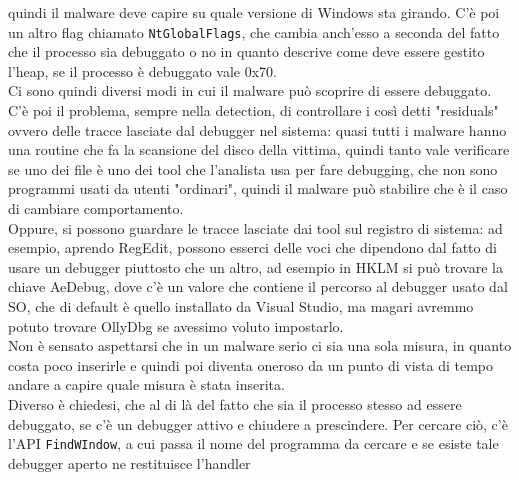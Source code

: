 \documentclass[12pt, oneside]{extbook}
\begin{document}
quindi il malware deve capire su quale versione di Windows sta girando. C'è poi un altro flag chiamato \texttt{NtGlobalFlags}, che cambia anch'esso a seconda del fatto che il processo sia debuggato o no in quanto descrive come deve essere gestito l'heap, se il processo è debuggato vale 0x70.\\Ci sono quindi diversi modi in cui il malware può scoprire di essere debuggato.\\C'è poi il problema, sempre nella detection, di controllare i così detti "residuals" ovvero delle tracce lasciate dal debugger nel sistema: quasi tutti i malware hanno una routine che fa la scansione del disco della vittima, quindi tanto vale verificare se uno dei file è uno dei tool che l'analista usa per fare debugging, che non sono programmi usati da utenti "ordinari", quindi il malware può stabilire che è il caso di cambiare comportamento.\\Oppure, si possono guardare le tracce lasciate dai tool sul registro di sistema: ad esempio, aprendo RegEdit, possono esserci delle voci che dipendono dal fatto di usare un debugger piuttosto che un altro, ad esempio in HKLM si può trovare la chiave AeDebug, dove c'è un valore che contiene il percorso al debugger usato dal SO, che di default è quello installato da Visual Studio, ma magari avremmo potuto trovare OllyDbg se avessimo voluto impostarlo.\\Non è sensato aspettarsi che in un malware serio ci sia una sola misura, in quanto costa poco inserirle e quindi poi diventa oneroso da un punto di vista di tempo andare a capire quale misura è stata inserita.\\Diverso è chiedesi, che al di là del fatto che sia il processo stesso ad essere debuggato, se c'è un debugger attivo e chiudere a prescindere. Per cercare ciò, c'è  l'API \texttt{FindWIndow}, a cui passa il nome del programma da cercare e se esiste tale debugger aperto ne restituisce l'handler
\end{document}
